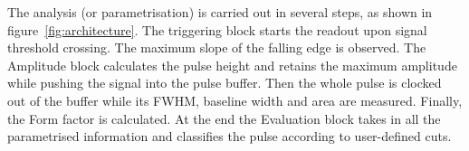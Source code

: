 The analysis (or parametrisation) is carried out in several steps, as shown in figure~\ref{fig:architecture}. The triggering block starts the readout upon signal threshold crossing. The maximum slope of the falling edge is observed. The Amplitude block calculates the pulse height and retains the maximum amplitude while pushing the signal into the pulse buffer. Then the whole pulse is clocked out of the buffer while its FWHM, baseline width and area are measured. Finally, the Form factor is calculated. At the end the Evaluation block takes in all the parametrised information and classifies the pulse according to user-defined cuts. 

